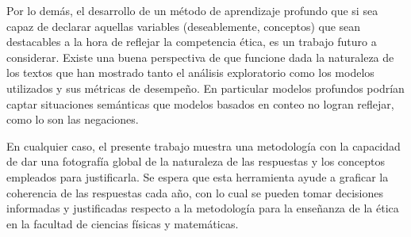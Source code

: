 \documentclass[
	spanish, %
	letterpaper, oneside
]{article}
\begin{document}
\newp Por lo demás, el desarrollo de un método de aprendizaje profundo que si sea capaz de declarar aquellas variables (deseablemente, conceptos) que sean destacables a la hora de reflejar la competencia ética, es un trabajo futuro a considerar. Existe una buena perspectiva de que funcione dada la naturaleza de los textos que han mostrado tanto el análisis exploratorio como los modelos utilizados y sus métricas de desempeño. En particular modelos profundos podrían captar situaciones semánticas que modelos basados en conteo no logran reflejar, como lo son las negaciones. 

\newp En cualquier caso, el presente trabajo muestra una metodología con la capacidad de dar una fotografía global de la naturaleza de las respuestas y los conceptos empleados para justificarla. Se espera que esta herramienta ayude a graficar la coherencia de las respuestas cada año, con lo cual se pueden tomar decisiones informadas y justificadas respecto a la metodología para la enseñanza de la ética en la facultad de ciencias físicas y matemáticas.

\iffalse
\begin{images}[\label{figure:glove}]{Descripción general}
    \addimage{img1}{width=5.5cm}{}
    \addimage{img2}{width=5.3cm}{}
    \imagesnewline
    \addimage{img3}{width=9cm}{}
\end{images}
\fi


\end{document}
